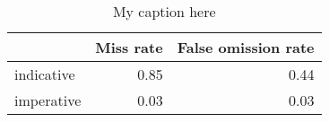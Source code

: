 \begin{table}[!ht]
\centering
\begin{tabular}{lrr}
\toprule
{} &  Miss rate &  False omission rate \\
\midrule
indicative &       0.85 &                 0.44 \\
imperative &       0.03 &                 0.03 \\
\bottomrule
\end{tabular}
\caption{My caption here}
\label{tab:MOOD-ocd-combined-errors}
\end{table}